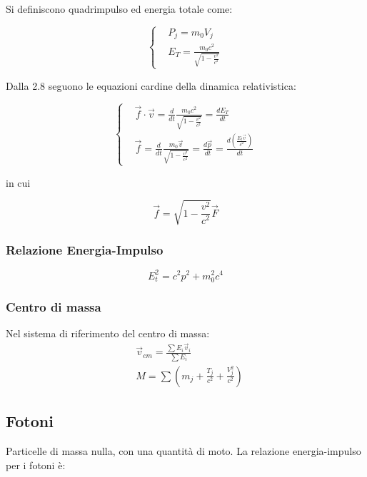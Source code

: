\documentclass{article}
\begin{document}
Si definiscono quadrimpulso ed energia totale come:

\begin{equation}
    \left\{
    \begin{aligned}
         & P_j=m_0V_j                                   \\
         & E_T= \frac{m_0c^2}{\sqrt{1-\frac{v^2}{c^2}}}
    \end{aligned}
    \right.
\end{equation}

Dalla 2.8 seguono le equazioni cardine della dinamica relativistica:

\begin{equation}
    \left\{
    \begin{aligned}
         & \vec{f}\cdot\vec{v}=\frac{d}{dt}\frac{m_0c^2}{\sqrt{1-\frac{v^2}{c^2}}}= \frac{d E_T}{dt}                                  \\
         & \vec{f}=\frac{d}{dt}\frac{m_0\vec{v}}{\sqrt{1-\frac{v^2}{c^2}}}=\frac{d \vec{p}}{dt}=\frac{d (\frac{E_t\vec{v}}{c^2})}{dt}
    \end{aligned}
    \right.
\end{equation}

in cui

\begin{equation}
    \vec{f}=\sqrt{1-\frac{v^2}{c^2}}\vec{F}
\end{equation}

\subsubsection{Relazione Energia-Impulso}

\begin{equation}
    E_t^2=c^2p^2+m_0^2c^4
\end{equation}

\subsubsection*{Centro di massa}
Nel sistema di riferimento del centro di massa:
\begin{equation}
    \begin{aligned}
         & \vec{v}_{cm}=\frac{\sum E_i\vec{v}_i}{\sum E_i} \\
         & M= \sum(m_j+\frac{T_j}{c^2}+\frac{V_j^2}{c^2})
    \end{aligned}
\end{equation}

\subsection{Fotoni}
Particelle di massa nulla, con una quantità di moto.
La relazione energia-impulso per i fotoni è:
\end{document}
